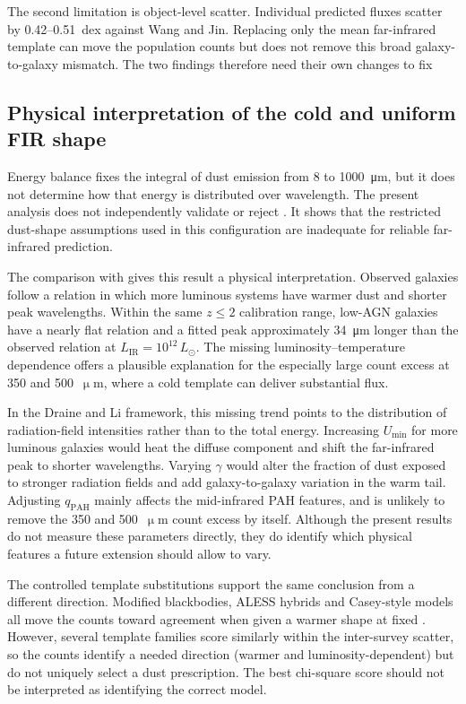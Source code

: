 \documentclass[12pt,a4paper]{article}
\begin{document}
The second limitation is object-level scatter. Individual predicted fluxes scatter by
0.42--\SI{0.51}{dex} against Wang and Jin. Replacing only the mean far-infrared template
can move the population counts but does not remove this broad galaxy-to-galaxy mismatch.
The two findings therefore need their own changes to fix

\subsection{Physical interpretation of the cold and uniform FIR shape}
\label{sec:discussion:cold}

Energy balance fixes the integral of dust emission from 8 to \SI{1000}{\um}, but it does
not determine how that energy is distributed over wavelength. The present analysis does
not independently validate or reject \LIR{}. It shows that the restricted dust-shape
assumptions used in this \popcosmos{} configuration are inadequate for reliable
far-infrared prediction.

The comparison with \citet{Drew_2022} gives this result a physical interpretation.
Observed galaxies follow a relation in which more luminous systems have warmer dust and
shorter peak wavelengths. Within the same $z\leq2$ calibration range, low-AGN
\popcosmos{} galaxies have a nearly flat relation and a fitted peak approximately
\SI{34}{\um} longer than the observed relation at
$L_\mathrm{IR}=10^{12}\,L_\odot$. The missing luminosity--temperature dependence offers
a plausible explanation for the especially large count excess at 350 and
500~$\upmu$m, where a cold template can deliver substantial flux.

In the Draine and Li framework, this missing trend points to the distribution of
radiation-field intensities rather than to the total energy. Increasing
$U_{\min}$ for more luminous galaxies would heat the diffuse component and shift
the far-infrared peak to shorter wavelengths. Varying $\gamma$ would alter the
fraction of dust exposed to stronger radiation fields and add galaxy-to-galaxy variation
in the warm tail. Adjusting $q_{\mathrm{PAH}}$  mainly affects the mid-infrared PAH
features, and is unlikely to remove the 350 and 500~$\upmu$m count excess by itself.
Although the present results do not measure these parameters directly, they do identify which physical features a future \popcosmos{} extension should allow to vary.

The controlled template substitutions support the same conclusion from a different
direction. Modified blackbodies, ALESS hybrids and Casey-style models all move the
counts toward agreement when given a warmer shape at fixed \LIR{}
\citep{Casey_2012,daCunha_2015}. However, several template families score similarly
within the inter-survey scatter, so the counts identify a needed direction (warmer and
luminosity-dependent) but do not uniquely select a dust prescription. The best
chi-square score should not be interpreted as identifying the correct  model.
\end{document}
